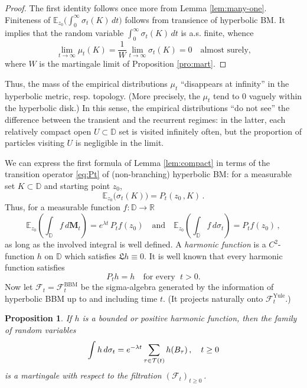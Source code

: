 \documentclass[12pt]{amsart}
\newcommand\AND{\quad\text{and}\quad}
\newcommand\BB{\textit{\textbf{B}}}
\newcommand\E{\mathbb E}
\newcommand\DD{\mathbb D}
\newcommand\F{\mathcal F}
\newcommand\Laa{\sigma}
\newcommand\Lap{\mathfrak{L}}
\newcommand\mm{\mathsf m}
\newcommand\Mbf{\mathbf M}
\newcommand\R{\mathbb R}
\newcommand\T{\mathcal T}
\newcommand\ww{W}
\numberwithin{theorem}{section}
\newtheorem{pro}[theorem]{Proposition}%
\theoremstyle{definition}
\begin{document}
\begin{proof}
The first identity follows once more from Lemma \ref{lem:many-one}. Finiteness of 
$\E_{z_0}\bigl( \int_0^{\infty}  \Laa_t(K)\,dt \bigr)$ follows from transience
of hyperbolic BM. It implies that the random variable $\int_0^{\infty}  \Laa_t(K)\,dt$
is a.s. finite, whence 
$$
\lim_{t \to \infty} \mu_t(K) = \frac{1}{\ww}
\lim_{t \to \infty} \Laa_t(K) = 0 \quad \text{almost surely,}
$$
where $\ww$ is the martingale limit of Proposition \ref{pro:mart}.
\end{proof}

Thus, the mass of the empirical distributions $\mu_t$ ``disappears at infinity''
in the hyperbolic metric, resp. topology. (More precisely, the $\mu_t$ tend to 0 vaguely within
the hyperbolic disk.) In this sense, the empirical distributions ``do not see'' the difference
between the transient and the recurrent regimes: in the latter, each relatively compact 
open $U \subset \DD$ set is visited
infinitely often, but the proportion of particles visiting $U$ is negligible in the limit. 

We can express the first formula of Lemma \ref{lem:compact} in terms of  the transition 
operator \eqref{eq:Pt} of (non-branching) hyperbolic BM: for a measurable set $K \subset \DD$
and starting point $z_0$, 
$$ 
\E_{z_0}\bigl( \Laa_t(K) \bigr) =  P_t(z_0\,,K)\,.%
$$ 
Thus, for a measurable function $f: \DD \to \R$
\begin{equation}\label{eq:fLambda}
\E_{z_0}\left( \int_{\DD} f\, d\Mbf_t \right) = e^{\lambda t}\,P_tf(z_0) \AND
\E_{z_0}\left( \int_{\DD} f\, d\Laa_t \right) = P_tf(z_0)\,,
\end{equation}
as long as the involved integral is well defined.
A \emph{harmonic function}
is a $C^2$-function $h$ on $\DD$ which satisfies $\Lap h \equiv 0$. It is well known that
every harmonic function satisfies
$$
P_t h = h \quad \text{for every }\; t > 0.
$$
Now let $\F_t = \F_t^{\text{BBM}}$ be the sigma-algebra generated by the information 
of hyperbolic BBM up to and
including time $t$. (It projects naturally onto $\F_t^{\text{Yule}}$.) 

\begin{pro}\label{pro:martingale}
If $h$ is a bounded or positive harmonic function, then the family of random variables
$$
\int h \, d\Laa_t = e^{-\lambda t}\sum_{\tau \in \T(t)} h(\BB_{\tau})\,,\quad t \ge 0
$$
is a martingale with respect to the filtration $(\F_t)_{t \ge 0}\,$.
\end{pro}
\end{document}

